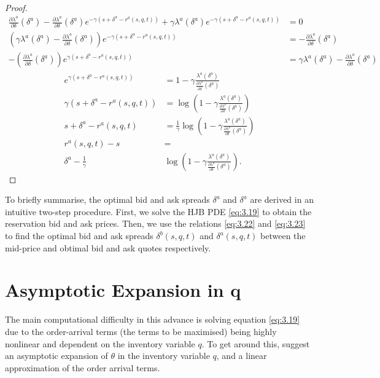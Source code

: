 \begin{proof}
\begin{align*}
        \frac{\partial\lambda^a}{\partial\delta}(\delta^a)-\frac{\partial\lambda^a}{\partial\delta}(\delta^a)e^{-\gamma(s+\delta^a-r^a(s,q,t))}+\gamma\lambda^a(\delta^a)e^{-\gamma(s+\delta^a-r^a(s,q,t))}&=0\\
        \left(\gamma\lambda^a(\delta^a)-\frac{\partial\lambda^a}{\partial\delta}(\delta^a)\right)e^{-\gamma(s+\delta^a-r^a(s,q,t))}&=-\frac{\partial\lambda^a}{\partial\delta}(\delta^a)\\
        -\left(\frac{\partial\lambda^a}{\partial\delta}(\delta^a)\right)e^{\gamma(s+\delta^a-r^a(s,q,t))}&=\gamma\lambda^a(\delta^a)-\frac{\partial\lambda^a}{\partial\delta}(\delta^a)
    \end{align*}
    \begin{align*}
        e^{\gamma(s+\delta^a-r^a(s,q,t))}&=1-\gamma\frac{\lambda^a(\delta^a)}{\frac{\partial\lambda^a}{\partial\delta}(\delta^a)}\\
        \gamma(s+\delta^a-r^a(s,q,t))&=\log\left(1-\gamma\frac{\lambda^a(\delta^a)}{\frac{\partial\lambda^a}{\partial\delta}(\delta^a)}\right)\\
        s+\delta^a-r^a(s,q,t)&=\frac{1}{\gamma}\log\left(1-\gamma\frac{\lambda^a(\delta^a)}{\frac{\partial\lambda^a}{\partial\delta}(\delta^a)}\right)\\
        r^a(s,q,t)-s&=\\
        \delta^a-\frac{1}{\gamma}&\log\left(1-\gamma\frac{\lambda^a(\delta^a)}{\frac{\partial\lambda^a}{\partial\delta}(\delta^a)}\right).
    \end{align*}
\end{proof}

To briefly summarise, the optimal bid and ask spreads $\delta^a$ and $\delta^a$ are
derived in an intuitive two-step procedure. First, we solve the HJB PDE \eqref{eq:3.19}
to obtain the reservation bid and ask prices. Then, we use the relations \eqref{eq:3.22}
and \eqref{eq:3.23} to find the optimal bid and ask spreads $\delta^b(s,q,t)$ and 
$\delta^a(s,q,t)$ between the mid-price and obtimal bid and ask quotes respectively.

\section{Asymptotic Expansion in q}\label{sec:3.8}

The main computational difficulty in this advance is solving equation \eqref{eq:3.19}
due to the order-arrival terms (the terms to be maximised) being highly nonlinear and
dependent on the inventory variable $q$. To get around this, \textcite{AS2008} suggest
an asymptotic expansion of $\theta$ in the inventory variable $q$, and a linear 
approximation of the order arrival terms. 

